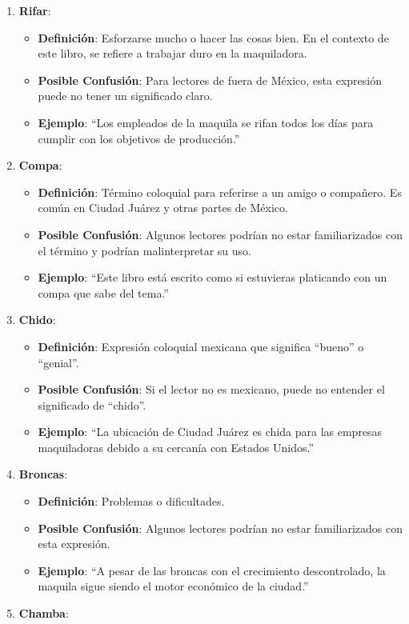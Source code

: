 \documentclass[
  10pt,
  letterpaper,
]{book}
\providecommand{\tightlist}{%
  \setlength{\itemsep}{0pt}\setlength{\parskip}{0pt}}\usepackage{longtable,booktabs,array}
\begin{document}
\begin{enumerate}
\def\labelenumi{\arabic{enumi}.}
\tightlist
\item
  \textbf{Rifar}:

  \begin{itemize}
  \tightlist
  \item
    \textbf{Definición}: Esforzarse mucho o hacer las cosas bien. En el
    contexto de este libro, se refiere a trabajar duro en la
    maquiladora.
  \item
    \textbf{Posible Confusión}: Para lectores de fuera de México, esta
    expresión puede no tener un significado claro.
  \item
    \textbf{Ejemplo}: ``Los empleados de la maquila se rifan todos los
    días para cumplir con los objetivos de producción.''
  \end{itemize}
\item
  \textbf{Compa}:

  \begin{itemize}
  \tightlist
  \item
    \textbf{Definición}: Término coloquial para referirse a un amigo o
    compañero. Es común en Ciudad Juárez y otras partes de México.
  \item
    \textbf{Posible Confusión}: Algunos lectores podrían no estar
    familiarizados con el término y podrían malinterpretar su uso.
  \item
    \textbf{Ejemplo}: ``Este libro está escrito como si estuvieras
    platicando con un compa que sabe del tema.''
  \end{itemize}
\item
  \textbf{Chido}:

  \begin{itemize}
  \tightlist
  \item
    \textbf{Definición}: Expresión coloquial mexicana que significa
    ``bueno'' o ``genial''.
  \item
    \textbf{Posible Confusión}: Si el lector no es mexicano, puede no
    entender el significado de ``chido''.
  \item
    \textbf{Ejemplo}: ``La ubicación de Ciudad Juárez es chida para las
    empresas maquiladoras debido a su cercanía con Estados Unidos.''
  \end{itemize}
\item
  \textbf{Broncas}:

  \begin{itemize}
  \tightlist
  \item
    \textbf{Definición}: Problemas o dificultades.
  \item
    \textbf{Posible Confusión}: Algunos lectores podrían no estar
    familiarizados con esta expresión.
  \item
    \textbf{Ejemplo}: ``A pesar de las broncas con el crecimiento
    descontrolado, la maquila sigue siendo el motor económico de la
    ciudad.''
  \end{itemize}
\item
  \textbf{Chamba}:


\end{enumerate}
\end{document}
